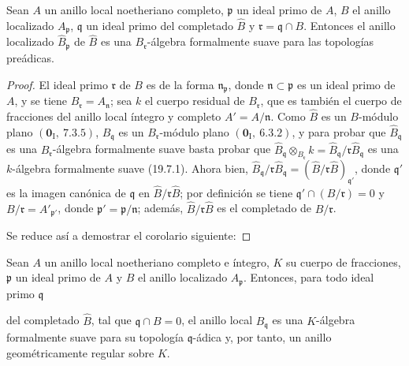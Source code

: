 \begin{theorem}[22.3.3]
\label{0.22.3.3-fr}
Sean $A$ un anillo local noetheriano \textup{completo}, $\mathfrak p$ un ideal primo
de $A$, $B$ el anillo localizado $A_\mathfrak p$, $\mathfrak q$ un ideal
primo del completado $\widehat B$ y $\mathfrak r=\mathfrak q\cap B$.
Entonces el anillo localizado $\widehat B_\mathfrak p$ de $\widehat B$ es una
$B_\mathfrak r$-álgebra formalmente suave para las topologías preádicas.
\end{theorem}

\begin{proof}
El ideal primo $\mathfrak r$ de $B$ es de la forma
$\mathfrak n_\mathfrak p$, donde $\mathfrak n\subset\mathfrak p$ es un ideal
primo de $A$, y se tiene $B_\mathfrak r=A_\mathfrak n$; sea $k$ el cuerpo
residual de $B_\mathfrak r$, que es también el cuerpo de fracciones del anillo
local íntegro y completo $A'=A/\mathfrak n$. Como $\widehat B$ es un
$B$-módulo plano $(\mathbf 0_\mathrm I,~7.3.5)$,
$\widehat B_\mathfrak q$ es un $B_\mathfrak r$-módulo plano
$(\mathbf 0_\mathrm I,~6.3.2)$, y para probar que
$\widehat B_\mathfrak q$ es una $B_\mathfrak r$-álgebra formalmente suave
basta probar que
$\widehat B_\mathfrak q\otimes_{B_\mathfrak r}k=\widehat B_\mathfrak q/\mathfrak r\widehat B_\mathfrak q$
es una $k$-álgebra formalmente suave (19.7.1). Ahora bien,
$\widehat B_\mathfrak q/\mathfrak r\widehat B_\mathfrak q
=(\widehat B/\mathfrak r\widehat B)_{\mathfrak q'}$, donde $\mathfrak q'$ es
la imagen canónica de $\mathfrak q$ en
$\widehat B/\mathfrak r\widehat B$; por definición se tiene
$\mathfrak q'\cap(B/\mathfrak r)=0$ y
$B/\mathfrak r=A'_{\mathfrak p'}$, donde
$\mathfrak p'=\mathfrak p/\mathfrak n$; además,
$\widehat B/\mathfrak r\widehat B$ es el completado de $B/\mathfrak r$.

Se reduce así a demostrar el corolario siguiente:
\end{proof}

\begin{corollary}[22.3.4]
\label{0.22.3.4-fr}
Sean $A$ un anillo local noetheriano \textup{completo} e íntegro, $K$ su cuerpo de
fracciones, $\mathfrak p$ un ideal primo de $A$ y $B$ el anillo localizado
$A_\mathfrak p$. Entonces, para todo ideal primo $\mathfrak q$


del completado $\widehat B$, tal que $\mathfrak q\cap B=0$, el anillo local
$\widehat B_\mathfrak q$ es una $K$-álgebra formalmente suave para su topología
$\mathfrak q$-ádica y, por tanto, un anillo geométricamente regular sobre
$K$.
\end{corollary}

